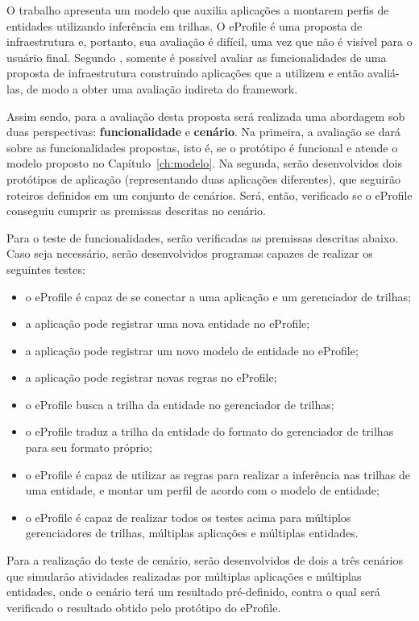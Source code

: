 O trabalho apresenta um modelo que auxilia aplicações a montarem perfis de entidades utilizando inferência em trilhas. O eProfile é uma proposta de infraestrutura e, portanto, sua avaliação é difícil, uma vez que não é visível para o usuário final. Segundo , somente é possível avaliar as funcionalidades de uma proposta de infraestrutura construindo aplicações que a utilizem e então avaliá-las, de modo a obter uma avaliação indireta do framework.

Assim sendo, para a avaliação desta proposta será realizada uma abordagem sob duas perspectivas: {\bf funcionalidade} e {\bf cenário}. Na primeira, a avaliação se dará sobre as funcionalidades propostas, isto é, se o protótipo é funcional e atende o modelo proposto no Capítulo~\ref{ch:modelo}. Na segunda, serão desenvolvidos dois protótipos de aplicação (representando duas aplicações diferentes), que seguirão roteiros definidos em um conjunto de cenários. Será, então, verificado se o eProfile conseguiu cumprir as premissas descritas no cenário.

Para o teste de funcionalidades, serão verificadas as premissas descritas abaixo. Caso seja necessário, serão desenvolvidos programas capazes de realizar os seguintes testes:

\begin{itemize}

\item o eProfile é capaz de se conectar a uma aplicação e um gerenciador de trilhas;
\item a aplicação pode registrar uma nova entidade no eProfile;
\item a aplicação pode registrar um novo modelo de entidade no eProfile;
\item a aplicação pode registrar novas regras no eProfile;
\item o eProfile busca a trilha da entidade no gerenciador de trilhas;
\item o eProfile traduz a trilha da entidade do formato do gerenciador de trilhas para seu formato próprio;
\item o eProfile é capaz de utilizar as regras para realizar a inferência nas trilhas de uma entidade, e montar um perfil de acordo com o modelo de entidade;
\item o eProfile é capaz de realizar todos os testes acima para múltiplos gerenciadores de trilhas, múltiplas aplicações e múltiplas entidades.

\end{itemize}

Para a realização do teste de cenário, serão desenvolvidos de dois a três cenários que simularão atividades realizadas por múltiplas aplicações e múltiplas entidades, onde o cenário terá um resultado pré-definido, contra o qual será verificado o resultado obtido pelo protótipo do eProfile.
